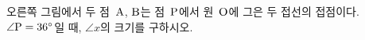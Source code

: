 \noindent\begin{minipage}[t]{0.58\linewidth}\vspace{0pt}\raggedright 오른쪽 그림에서 두 점~$\mathrm{A}$, $\mathrm{B}$는 점~$\mathrm{P}$에서 원~$\mathrm{O}$에 그은 두 접선의 접점이다. $\angle\mathrm{P}=36^\circ$일 때, $\angle x$의 크기를 구하시오.\end{minipage}\hfill\begin{minipage}[t]{0.4\linewidth}\vspace{0pt}\centering \resizebox{\ifdim\width>\linewidth\linewidth\else\width\fi}{!}{}\end{minipage}\par
